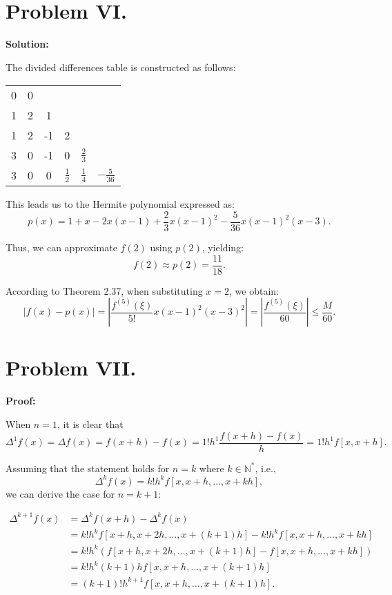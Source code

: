 \documentclass[a4paper]{article}
\begin{document}
\section*{Problem VI.}

\textbf{Solution:}

The divided differences table is constructed as follows:

\begin{table}[h]
    \centering
    \begin{tabular}{c|ccccc}
        0 & 0 &  &  &  &    \\
        1 & 2 & 1 &  &  &    \\
        1 & 2 & -1 & 2 &  &    \\
        3 & 0 & -1 & 0 & $\frac{2}{3}$ &    \\
        3 & 0 & 0 & $\frac{1}{2}$ & $\frac{1}{4}$ & $-\frac{5}{36}$ 
    \end{tabular}
\end{table}

This leads us to the Hermite polynomial expressed as:
\[
p(x)=1+x-2x(x-1)+\frac{2}{3}x(x-1)^2-\frac{5}{36}x(x-1)^2(x-3).
\]

Thus, we can approximate \( f(2) \) using \( p(2) \), yielding:
\[
\boxed{f(2) \approx p(2) = \frac{11}{18}}.
\]

According to Theorem 2.37, when substituting \( x=2 \), we obtain:
\[
\boxed{|f(x)-p(x)| = \left|\frac{f^{(5)}(\xi)}{5!}x(x-1)^2(x-3)^2\right| = \left|\frac{f^{(5)}(\xi)}{60}\right| \leq \frac{M}{60}}.
\]

\section*{Problem VII.}

\textbf{Proof:}

When \( n=1 \), it is clear that 
\[
\Delta^1 f(x) = \Delta f(x) = f(x+h) - f(x) = 1! h^1 \frac{f(x+h) - f(x)}{h} = 1! h^1 f[x, x+h].
\]

Assuming that the statement holds for \( n=k \) where \( k \in \mathbb{N}^* \), i.e., 
\[
\Delta^k f(x) = k! h^k f[x, x+h, \ldots, x+kh],
\]
we can derive the case for \( n=k+1 \):

\[
\begin{aligned}
\Delta^{k+1} f(x) & = \Delta^k f(x+h) - \Delta^k f(x) \\
& = k! h^k f[x+h, x+2h, \ldots, x+(k+1)h] - k! h^k f[x, x+h, \ldots, x+kh] \\
& = k! h^k \left( f[x+h, x+2h, \ldots, x+(k+1)h] - f[x, x+h, \ldots, x+kh] \right) \\
& = k! h^k (k+1) h f[x, x+h, \ldots, x+(k+1)h] \\
& = (k+1)! h^{k+1} f[x, x+h, \ldots, x+(k+1)h].
\end{aligned}
\]
\end{document}
